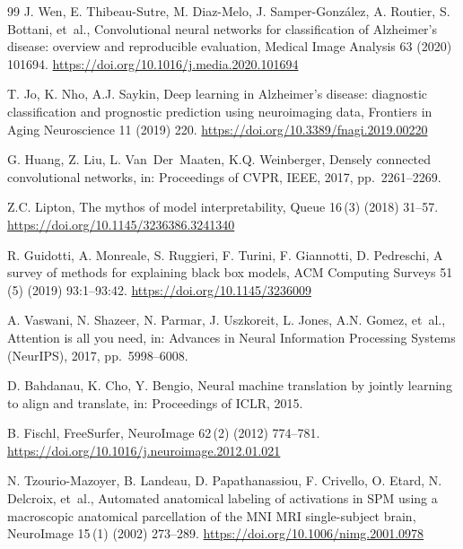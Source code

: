 \documentclass[12pt,a4paper]{article}
\begin{document}
\begin{thebibliography}{99}
J. Wen, E. Thibeau-Sutre, M. Diaz-Melo, J. Samper-Gonz\'{a}lez, A. Routier, S. Bottani, et~al., Convolutional neural networks for classification of Alzheimer's disease: overview and reproducible evaluation, Medical Image Analysis 63 (2020) 101694.
\url{https://doi.org/10.1016/j.media.2020.101694}

T. Jo, K. Nho, A.J. Saykin, Deep learning in Alzheimer's disease: diagnostic classification and prognostic prediction using neuroimaging data, Frontiers in Aging Neuroscience 11 (2019) 220.
\url{https://doi.org/10.3389/fnagi.2019.00220}

G. Huang, Z. Liu, L. Van~Der~Maaten, K.Q. Weinberger, Densely connected convolutional networks, in: Proceedings of CVPR, IEEE, 2017, pp.\ 2261--2269.

Z.C. Lipton, The mythos of model interpretability, Queue 16\,(3) (2018) 31--57.
\url{https://doi.org/10.1145/3236386.3241340}

R. Guidotti, A. Monreale, S. Ruggieri, F. Turini, F. Giannotti, D. Pedreschi, A survey of methods for explaining black box models, ACM Computing Surveys 51\,(5) (2019) 93:1--93:42.
\url{https://doi.org/10.1145/3236009}

A. Vaswani, N. Shazeer, N. Parmar, J. Uszkoreit, L. Jones, A.N. Gomez, et~al., Attention is all you need, in: Advances in Neural Information Processing Systems (NeurIPS), 2017, pp.\ 5998--6008.

D. Bahdanau, K. Cho, Y. Bengio, Neural machine translation by jointly learning to align and translate, in: Proceedings of ICLR, 2015.

B. Fischl, FreeSurfer, NeuroImage 62\,(2) (2012) 774--781.
\url{https://doi.org/10.1016/j.neuroimage.2012.01.021}

N. Tzourio-Mazoyer, B. Landeau, D. Papathanassiou, F. Crivello, O. Etard, N. Delcroix, et~al., Automated anatomical labeling of activations in SPM using a macroscopic anatomical parcellation of the MNI MRI single-subject brain, NeuroImage 15\,(1) (2002) 273--289.
\url{https://doi.org/10.1006/nimg.2001.0978}


\end{thebibliography}
\end{document}
